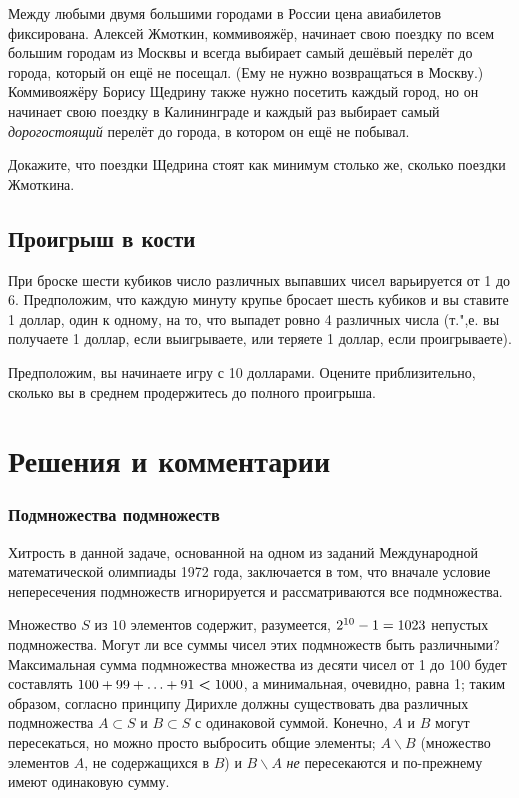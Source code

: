 \documentclass[twoside]{book}
\makeatletter
\newcommand{\rindex}[2][\imki@jobname]{%
  \index[#1]{\detokenize{#2}}%
}
\makeatother
\begin{document}
Между любыми двумя большими городами в России цена авиабилетов фиксирована.
Алексей Жмоткин, коммивояжёр, начинает свою поездку по всем большим городам из Москвы и всегда выбирает самый дешёвый перелёт до города, который он ещё не посещал.
(Ему не нужно возвращаться в Москву.)
Коммивояжёру Борису Щедрину также нужно посетить каждый город, но он начинает свою поездку в Калининграде и каждый раз выбирает самый \emph{дорогостоящий} перелёт до города, в котором он ещё не побывал.

Докажите, что поездки Щедрина стоят как минимум столько же, сколько поездки Жмоткина.

\subsection*{Проигрыш в кости}%
\rindex{Проигрыш в кости}

При броске шести кубиков число различных выпавших чисел варьируется от 1 до 6.
Предположим, что каждую минуту крупье бросает шесть кубиков
и вы ставите 1 доллар, один к одному, на то, что выпадет ровно 4 различных числа
(т.",е. вы получаете 1 доллар, если выигрываете, или теряете 1 доллар, если проигрываете).

Предположим, вы начинаете игру с 10 долларами.
Оцените приблизительно, сколько вы в среднем продержитесь до полного проигрыша.


\section*{Решения и комментарии}

\subsubsection*{Подмножества подмножеств}%

Хитрость в данной задаче, основанной на одном из заданий Международной математической олимпиады 1972 года, заключается в том, что вначале условие непересечения подмножеств игнорируется и рассматриваются все подмножества.

\medskip

Множество $S$ из $10$ элементов содержит, разумеется, $2^{10} - 1 \z= 1023$ непустых подмножества.
Могут ли все суммы чисел этих подмножеств быть различными?
Максимальная сумма подмножества множества из десяти чисел от 1 до 100 будет составлять 
$100+99+\ldots+91\hm<1000$, а минимальная, очевидно, равна 1; таким образом, согласно принципу Дирихле должны существовать два различных подмножества $A\subset S$ и $B\subset S$ 
с одинаковой суммой.
Конечно, $A$ и $B$ могут пересекаться, но можно просто выбросить общие элементы;
$A\backslash B$ (множество элементов $A$, не содержащихся в $B$) и $B\backslash A$ \emph{не} пересекаются и по-прежнему имеют одинаковую сумму.\heart
\end{document}
